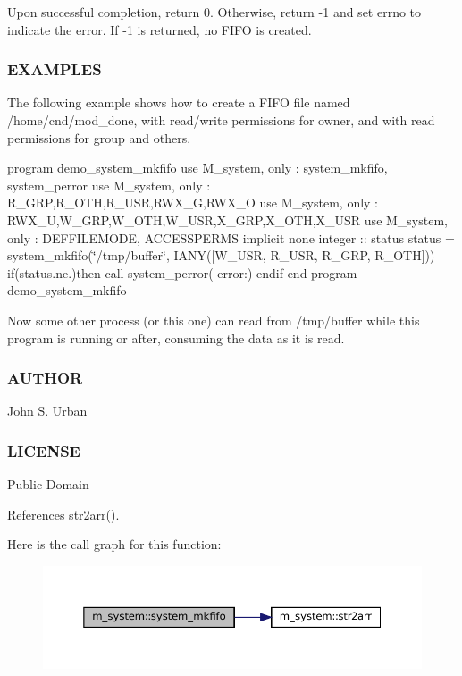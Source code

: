 Upon successful completion, return 0. Otherwise, return -\/1 and set errno to indicate the error. If -\/1 is returned, no F\+I\+FO is created.

\subsubsection*{E\+X\+A\+M\+P\+L\+ES}

The following example shows how to create a F\+I\+FO file named /home/cnd/mod\+\_\+done, with read/write permissions for owner, and with read permissions for group and others.

program demo\+\_\+system\+\_\+mkfifo use M\+\_\+system, only \+: system\+\_\+mkfifo, system\+\_\+perror use M\+\_\+system, only \+: R\+\_\+\+G\+RP,R\+\_\+\+O\+TH,R\+\_\+\+U\+SR,R\+W\+X\+\_\+G,R\+W\+X\+\_\+O use M\+\_\+system, only \+: R\+W\+X\+\_\+U,W\+\_\+\+G\+RP,W\+\_\+\+O\+TH,W\+\_\+\+U\+SR,X\+\_\+\+G\+RP,X\+\_\+\+O\+TH,X\+\_\+\+U\+SR use M\+\_\+system, only \+: D\+E\+F\+F\+I\+L\+E\+M\+O\+DE, A\+C\+C\+E\+S\+S\+P\+E\+R\+MS implicit none integer \+:\+: status status = system\+\_\+mkfifo(\char`\"{}/tmp/buffer\char`\"{}, I\+A\+N\+Y(\mbox{[}\+W\+\_\+\+U\+S\+R, R\+\_\+\+U\+S\+R, R\+\_\+\+G\+R\+P, R\+\_\+\+O\+T\+H\mbox{]})) if(status.\+ne.)then call system\+\_\+perror( error\+:\textquotesingle{}) endif end program demo\+\_\+system\+\_\+mkfifo

Now some other process (or this one) can read from /tmp/buffer while this program is running or after, consuming the data as it is read.

\subsubsection*{A\+U\+T\+H\+OR}

John S. Urban \subsubsection*{L\+I\+C\+E\+N\+SE}

Public Domain 

References str2arr().

Here is the call graph for this function\+:
\nopagebreak
\begin{figure}[H]
\begin{center}
\leavevmode
\includegraphics[width=350pt]{namespacem__system_ab2d95258ee26b85a0283538880775475_cgraph}
\end{center}
\end{figure}
\mbox{\label{namespacem__system_a622cc67c03e8cdea1d4c2430bb36081b}} 
